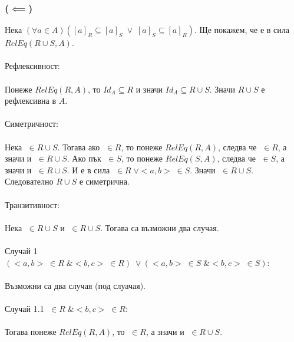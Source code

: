 \documentclass[12pt]{article}
\begin{document}
\subsubsection*{(\(\impliedby\))}
Нека \((\forall a \in A)([a]_R \subseteq [a]_S \; \lor \; [a]_S \subseteq [a]_R)\).
Ще покажем, че е в сила \(RelEq(R \cup S, A)\).
\\
\vspace{1mm}
\\
Рефлексивност:
\\
\vspace{1mm}
\\
Понеже \(RelEq(R, A)\), то \(Id_A \subseteq R\) и значи \(Id_A \subseteq R \cup S\).
Значи \(R \cup S\) е рефлексивна в \(A\).
\\
\vspace{1mm}
\\
Симетричност:
\\
\vspace{1mm}
\\
Нека \(<a, b> \; \in R \cup S\).
Тогава ако \(<a, b> \; \in R\), то понеже \(RelEq(R, A)\),
следва че \(<b, a> \; \in R\), а значи и \(<b, a> \; \in R \cup S\).
Ако пък \(<a, b> \; \in S\), то понеже \(RelEq(S, A)\),
следва че \(<b, a> \; \in S\), а значи и \(<b, a> \; \in R \cup S\).
И е в сила \(<a, b> \; \in R \; \lor <a, b> \; \in S\).
Значи \(<b, a> \; \in R \cup S\).
Следователно \(R \cup S\) е симетрична.
\\
\vspace{1mm}
\\
Транзитивност:
\\
\vspace{1mm}
\\
Нека \(<a, b> \; \in R \cup S\) и \(<b, c> \; \in R \cup S\).
Тогава са възможни два случая.
\\
\vspace{1mm}
\\
Случай 1 \((<a, b> \; \in R \; \& <b, c> \; \in R) \; \lor (<a, b> \; \in S \; \& <b, c> \; \in S)\):
\\
\vspace{1mm}
\\
Възможни са два случая (под слуачая).
\\
\vspace{1mm}
\\
Случай 1.1 \(<a, b> \; \in R \; \& <b, c> \; \in R\):
\\
\vspace{1mm}
\\
Тогава понеже \(RelEq(R, A)\), то \(<a, c> \; \in R\), а значи и \(<a, c> \; \in R \cup S\).
\end{document}
